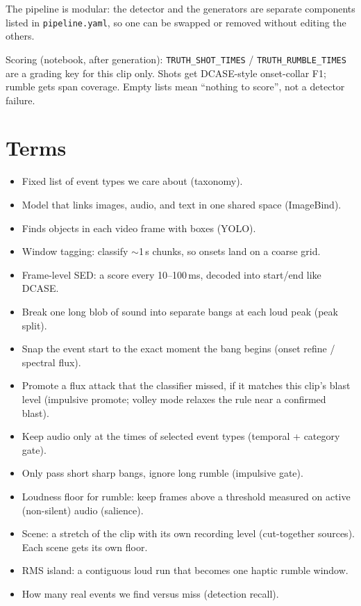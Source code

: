\documentclass[11pt,a4paper]{article}
\begin{document}
The pipeline is modular: the detector and the generators are separate components listed in \texttt{pipeline.yaml}, so one can be swapped or removed without editing the others.

Scoring (notebook, after generation): \texttt{TRUTH\_SHOT\_TIMES} / \texttt{TRUTH\_RUMBLE\_TIMES} are a grading key for this clip only. Shots get DCASE-style onset-collar F1; rumble gets span coverage. Empty lists mean ``nothing to score'', not a detector failure.

\section{Terms}
\begin{itemize}[leftmargin=*,itemsep=3pt]
  \item Fixed list of event types we care about (taxonomy).
  \item Model that links images, audio, and text in one shared space (ImageBind).
  \item Finds objects in each video frame with boxes (YOLO).
  \item Window tagging: classify $\sim$1\,s chunks, so onsets land on a coarse grid.
  \item Frame-level SED: a score every 10--100\,ms, decoded into start/end like DCASE.
  \item Break one long blob of sound into separate bangs at each loud peak (peak split).
  \item Snap the event start to the exact moment the bang begins (onset refine / spectral flux).
  \item Promote a flux attack that the classifier missed, if it matches this clip's blast level (impulsive promote; volley mode relaxes the rule near a confirmed blast).
  \item Keep audio only at the times of selected event types (temporal + category gate).
  \item Only pass short sharp bangs, ignore long rumble (impulsive gate).
  \item Loudness floor for rumble: keep frames above a threshold measured on active (non-silent) audio (salience).
  \item Scene: a stretch of the clip with its own recording level (cut-together sources). Each scene gets its own floor.
  \item RMS island: a contiguous loud run that becomes one haptic rumble window.
  \item How many real events we find versus miss (detection recall).

\end{itemize}
\end{document}
